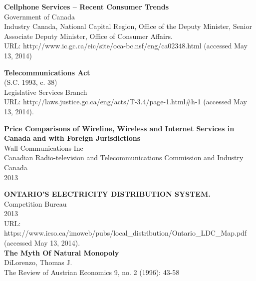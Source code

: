 \documentclass{article}
\newcommand\bold[1]{\textbf{#1}}
\begin{document}
\begin{thebibliography}{1}

\bold{Cellphone Services -- Recent Consumer Trends}\\
 Government of Canada\\
 Industry Canada, National Capital Region, Office of the Deputy Minister, Senior Associate Deputy Minister, Office of Consumer Affairs.\\
URL:  http://www.ic.gc.ca/eic/site/oca-bc.nsf/eng/ca02348.html (accessed May 13, 2014)


\bold{Telecommunications Act}\\
(S.C. 1993, c. 38)\\
 Legislative Services Branch\\
URL:  http://laws.justice.gc.ca/eng/acts/T-3.4/page-1.html\#h-1 (accessed May 13, 2014).

\bold{Price Comparisons of Wireline, Wireless and Internet Services in Canada and with Foreign Jurisdictions}\\
Wall Communications Inc\\
Canadian Radio-television and Telecommunications Commission and Industry Canada\\
2013

\bold{ONTARIO’S ELECTRICITY DISTRIBUTION SYSTEM.}\\
Competition Bureau\\
2013\\
URL: \\https://www.ieso.ca/imoweb/pubs/local\_distribution/Ontario\_LDC\_Map.pdf (accessed May 13, 2014).\\

\bold{The Myth Of Natural Monopoly}\\
DiLorenzo, Thomas J.\\
 The Review of Austrian Economics 9, no. 2 (1996): 43-58\\

  \end{thebibliography}







%

%
\end{document}
